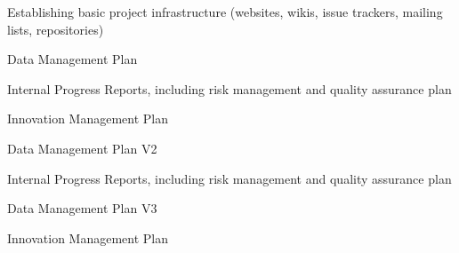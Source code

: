 \begin{workpackage}
\begin{wpdelivs}
\begin{wpdeliv}[due=1,id=tickets,dissem=PU,nature=DEC,lead=PS]{Establishing basic project infrastructure 
    (websites, wikis, issue trackers, mailing lists, repositories)}
\end{wpdeliv}

\begin{wpdeliv}[due=6,id=data-plan1,dissem=PU,nature=R,lead=PS]{Data Management Plan}
\end{wpdeliv}

\begin{wpdeliv}[due=12,lead=PS,
id=ipr,dissem=CO,nature=R]{Internal Progress Reports, including risk management and quality assurance plan}
\end{wpdeliv}

\begin{wpdeliv}[due=18,lead=PS,
id=tickets,dissem=CO,nature=R]{Innovation Management Plan}
\end{wpdeliv}
\begin{wpdeliv}[due=18,id=data-plan2,dissem=PU,nature=R,lead=PS]{Data Management Plan V2}
\end{wpdeliv}

\begin{wpdeliv}[due=36,lead=PS,
id=ipr2,dissem=CO,nature=R]{Internal Progress Reports, including risk management and quality assurance plan}
\end{wpdeliv}
\begin{wpdeliv}[due=36,id=data-plan3,dissem=PU,nature=R,lead=PS]{Data Management Plan V3}
\end{wpdeliv}

\begin{wpdeliv}[due=45,lead=PS,
id=tickets,dissem=CO,nature=R]{Innovation Management Plan}
\end{wpdeliv}




\end{wpdelivs}
\end{workpackage}

